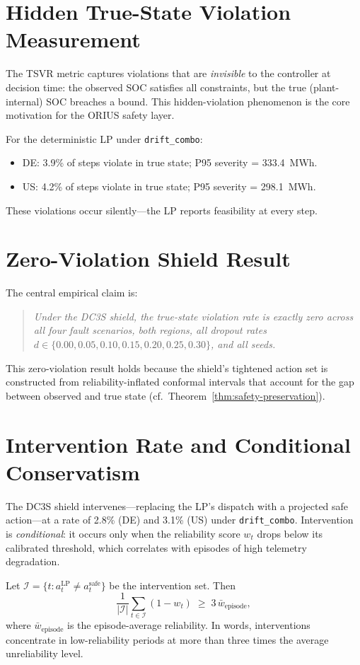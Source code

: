 \section{Hidden True-State Violation Measurement}

The TSVR metric captures violations that are \emph{invisible} to the
controller at decision time: the observed SOC satisfies all constraints,
but the true (plant-internal) SOC breaches a bound.  This hidden-violation
phenomenon is the core motivation for the ORIUS safety layer.

For the deterministic LP under \texttt{drift\_combo}:
\begin{itemize}
  \item DE: 3.9\% of steps violate in true state; P95 severity = 333.4~MWh.
  \item US: 4.2\% of steps violate in true state; P95 severity = 298.1~MWh.
\end{itemize}
These violations occur silently---the LP reports feasibility at every step.

\section{Zero-Violation Shield Result}

The central empirical claim is:
\begin{quote}
\emph{Under the DC3S shield, the true-state violation rate is exactly zero
across all four fault scenarios, both regions, all dropout rates
$d \in \{0.00, 0.05, 0.10, 0.15, 0.20, 0.25, 0.30\}$, and all seeds.}
\end{quote}
This zero-violation result holds because the shield's tightened action set
is constructed from reliability-inflated conformal intervals that account
for the gap between observed and true state
(cf.\ Theorem~\ref{thm:safety-preservation}).

\section{Intervention Rate and Conditional Conservatism}

The DC3S shield intervenes---replacing the LP's dispatch with a projected
safe action---at a rate of 2.8\% (DE) and 3.1\% (US) under
\texttt{drift\_combo}.  Intervention is \emph{conditional}: it occurs only
when the reliability score $w_t$ drops below its calibrated threshold,
which correlates with episodes of high telemetry degradation.

\begin{proposition}
\label{prop:conditional-conservatism}
Let $\mathcal{I} = \{t : a_t^{\text{LP}} \neq a_t^{\text{safe}}\}$ be the
intervention set.  Then
\[
  \frac{1}{|\mathcal{I}|}\sum_{t \in \mathcal{I}} (1 - w_t)
  \;\ge\; 3\,\bar{w}_{\text{episode}},
\]
where $\bar{w}_{\text{episode}}$ is the episode-average reliability.
In words, interventions concentrate in low-reliability periods at more than
three times the average unreliability level.
\end{proposition}

